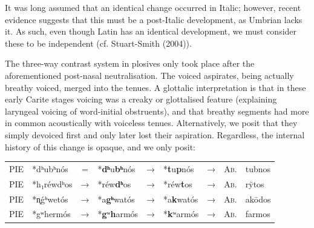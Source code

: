 \documentclass[svgnames,x11names,b5paper]{book}
\begin{document}
            It was long assumed that an identical change occurred in Italic; however, recent evidence suggests that this must be a post-Italic development, as Umbrian lacks it. As such, even though Latin has an identical development, we must consider these to be independent (cf. Stuart-Smith (2004)).

        The three-way contrast system in plosives only took place after the aforementioned post-nasal neutralisation. The voiced aspirates, being actually breathy voiced, merged into the tenues. A glottalic interpretation is that in these early Carite stages voicing was a creaky or glottalised feature (explaining laryngeal voicing of word-initial obstruents), and that breathy segments had more in common acoustically with voiceless tenues. Alternatively, we posit that they simply devoiced first and only later lost their aspiration. Regardless, the internal history of this change is opaque, and we only posit:

            \begin{table}[H]
                \begin{center}
                \begin{tabular}{llcllllll}
                \textsc{PIE} & *dʰubʰnós & = & *\textbf{dʰ}u\textbf{bʰ}nós & → & *\textbf{t}u\textbf{p}nós & → & \textsc{Ab.} & tubnos\\
                \textsc{PIE} & *h₁réwdʰos & → & *réw\textbf{dʰ}os & → & *réw\textbf{t}os & → & \textsc{Ab.} & rȳtos\\
                \textsc{PIE} & *n̥ǵʰwetós & → & *a\textbf{gʰ}watós & → & *a\textbf{k}watós & → & \textsc{Ab.} & akōdos\\
                \textsc{PIE} & *gʷhermós & → & *\textbf{g}ʷ\textbf{h}armós & → & *\textbf{k}ʷarmós & → & \textsc{Ab.} & farmos\\
                \end{tabular}
                \end{center}
                \end{table}
        
\end{document}
